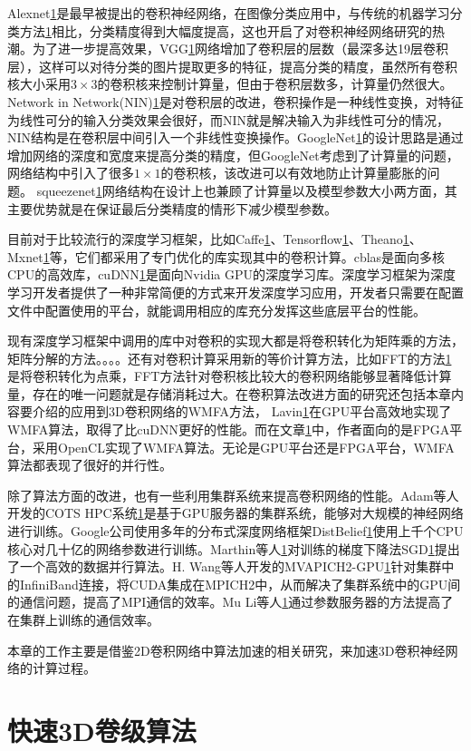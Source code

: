 Alexnet\ref{}是最早被提出的卷积神经网络，在图像分类应用中，与传统的机器学习分类方法\ref{}相比，分类精度得到大幅度提高，这也开启了对卷积神经网络研究的热潮。为了进一步提高效果，VGG\ref{}网络增加了卷积层的层数（最深多达19层卷积层），这样可以对待分类的图片提取更多的特征，提高分类的精度，虽然所有卷积核大小采用$3\times 3$的卷积核来控制计算量，但由于卷积层数多，计算量仍然很大。Network in Network(NIN)\ref{}是对卷积层的改进，卷积操作是一种线性变换，对特征为线性可分的输入分类效果会很好，而NIN就是解决输入为非线性可分的情况，NIN结构是在卷积层中间引入一个非线性变换操作。GoogleNet\ref{}的设计思路是通过增加网络的深度和宽度来提高分类的精度，但GoogleNet考虑到了计算量的问题，网络结构中引入了很多$1\times 1$的卷积核，该改进可以有效地防止计算量膨胀的问题。 squeezenet\ref{}网络结构在设计上也兼顾了计算量以及模型参数大小两方面，其主要优势就是在保证最后分类精度的情形下减少模型参数。

目前对于比较流行的深度学习框架，比如Caffe\ref{}、Tensorflow\ref{}、Theano\ref{}、Mxnet\ref{}等，它们都采用了专门优化的库实现其中的卷积计算。cblas是面向多核CPU的高效库，cuDNN\ref{}是面向Nvidia GPU的深度学习库。深度学习框架为深度学习开发者提供了一种非常简便的方式来开发深度学习应用，开发者只需要在配置文件中配置使用的平台，就能调用相应的库充分发挥这些底层平台的性能。

现有深度学习框架中调用的库中对卷积的实现大都是将卷积转化为矩阵乘的方法，矩阵分解的方法。。。。还有对卷积计算采用新的等价计算方法，比如FFT的方法\ref{}是将卷积转化为点乘，FFT方法针对卷积核比较大的卷积网络能够显著降低计算量，存在的唯一问题就是存储消耗过大。在卷积算法改进方面的研究还包括本章内容要介绍的应用到3D卷积网络的WMFA方法， Lavin\ref{}在GPU平台高效地实现了WMFA算法，取得了比cuDNN更好的性能。而在文章\ref{}中，作者面向的是FPGA平台，采用OpenCL实现了WMFA算法。无论是GPU平台还是FPGA平台，WMFA算法都表现了很好的并行性。

除了算法方面的改进，也有一些利用集群系统来提高卷积网络的性能。Adam等人开发的COTS HPC系统\ref{}是基于GPU服务器的集群系统，能够对大规模的神经网络进行训练。Google公司使用多年的分布式深度网络框架DistBelief\ref{}使用上千个CPU核心对几十亿的网络参数进行训练。Marthin等人\ref{}对训练的梯度下降法SGD\ref{}提出了一个高效的数据并行算法。H. Wang等人开发的MVAPICH2-GPU\ref{}针对集群中的InfiniBand连接，将CUDA集成在MPICH2中，从而解决了集群系统中的GPU间的通信问题，提高了MPI通信的效率。Mu Li等人\ref{}通过参数服务器的方法提高了在集群上训练的通信效率。

本章的工作主要是借鉴2D卷积网络中算法加速的相关研究，来加速3D卷积神经网络的计算过程。
\section{快速3D卷级算法}


